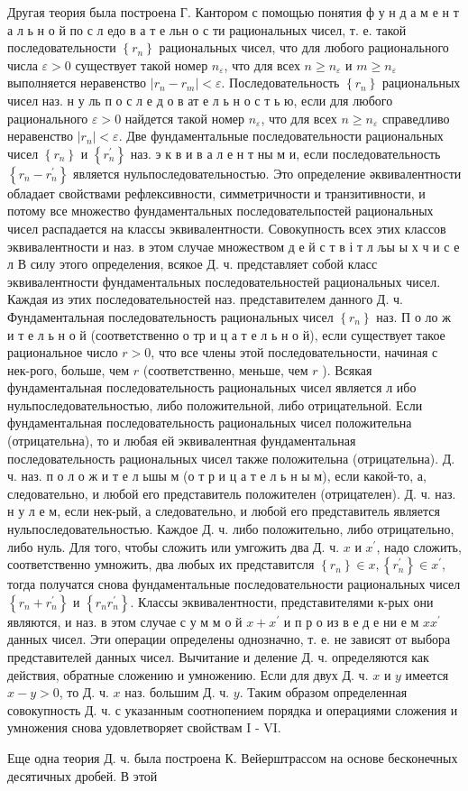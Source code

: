 \documentclass[10pt]{article}
\begin{document}
Другая теория была построена Г. Кантором с помощью понятия ф у н д а м е н т а л ь н о й по с л едо в а т е льн о с ти рациональных чисел, т. е. такой последовательности $\left\{r_{n}\right\}$ рациональных чисел, что для любого рационального числа $\varepsilon>0$ существует такой номер $n_{\varepsilon}$, что для всех $n \geqslant n_{\varepsilon}$ и $m \geqslant n_{\varepsilon}$ выполняется неравенство $\left|r_{n}-r_{m}\right|<\varepsilon$. Последовательность $\left\{r_{n}\right\}$ рациональных чисел наз. н у ль п о с л е д о в ат е л ь н о с т ь ю, если для любого рационального $\varepsilon>0$ найдется такой номер $n_{\varepsilon}$, что для всех $n \geqslant n_{\varepsilon}$ справедливо неравенство $\left|r_{n}\right|<\varepsilon$. Две фундаментальные последовательности рациональных чисел $\left\{r_{n}\right\}$ и $\left\{r_{n}^{\prime}\right\}$ наз. э к в и в а л е н т ны м и, если последовательность $\left\{r_{n}-r_{n}^{\prime}\right\}$ является нульпоследовательностью. Это определение әквивалентности обладает свойствами рефлексивности, симметричности и транзитивности, и потому все множество фундаментальных последовательпостей рациональных чисел распадается на классы эквивалентности. Совокупность всех этих классов эквивалентности и наз. в этом случае множеством д е й с т в і т л љы ы х ч и с е л В силу этого определения, всякое Д. ч. представляет собой класс эквивалентности фундаментальных последовательностей рациональных чисел. Каждая из этих последовательностей наз. представителем данного Д. ч. Фундаментальная последовательность рациональных чисел $\left\{r_{n}\right\}$ наз. П о ло ж и т е л ь н о й (соответственно о тр и ц а т е л ь н о й), если существует такое рациональное число $r>0$, что все члены этой последовательности, начиная с нек-рого, больше, чем $r$ (соответственно, меньше, чем $r$ ). Всякая фундаментальная последовательность рациональных чисел является л ибо нульпоследовательностью, либо положительной, либо отрицательной. Если фундаментальная последовательность рациональных чисел положительна (отрицательна), то и любая ей эквивалентная фундаментальная последовательность рациональных чисел также положительна (отрицательна). Д. ч. наз. п о л о ж и т е л ьшы м (о т р и ц а т е л ь н ы м), если какой-то, а, следовательно, и любой его представитель положителен (отрицателен). Д. ч. наз. н у л е м, если нек-рый, а следовательно, и любой его представитель является нульпоследовательностью. Каждое Д. ч. либо положительно, либо отрицательно, либо нуль. Для того, чтобы сложить или умгожить два Д. ч. $x$ и $x^{\prime}$, надо сложить, соответственно умножить, два любых их представитсля $\left\{r_{n}\right\} \in x,\left\{r_{n}^{\prime}\right\} \in x^{\prime}$, тогда получатся снова фундаментальные последовательности рациональных чисел $\left\{r_{n}+r_{n}^{\prime}\right\}$ и $\left\{r_{n} r_{n}^{\prime}\right\}$. Классы эквивалентности, представителями к-рых они являются, и наз. в этом случае с у м м о й $x+x^{\prime}$ и п р о из в е д е ни е м $x x^{\prime}$ данных чисел. Эти операции определены однозначно, т. е. не зависят от выбора представителей данных чисел. Вычитание и деление Д. ч. определяются как действия, обратные сложению и умножению. Если для двух Д. ч. $x$ и $y$ имеется $x-y>0$, то Д. ч. $x$ наз. большим Д. ч. $y$. Таким образом определенная совокупность Д. ч. с указанным соотнопением порядка и операциями сложения и умножения снова удовлетворяет свойствам I - VI.



Еще одна теория Д. ч. была построена К. Вейерштрассом на основе бесконечных десятичных дробей. В этой
\end{document}
